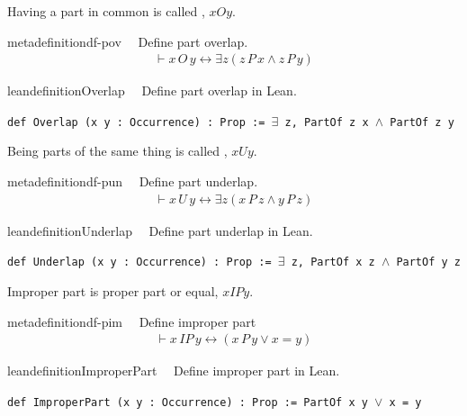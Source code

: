 \pn Having a part in common is called , $xOy$.
\begin{restatable}{metadefinition}{df-pov}~~ Define part overlap.
\begin{align}
\vdash x \,O \,y \leftrightarrow \exists z ( z \,P \,x \wedge z \,P \,y
    )\label{eq:df-pov}\tag{df-pov}
\end{align}
\end{restatable}

\begin{restatable}{leandefinition}{Overlap}~~ Define part overlap in Lean.

\texttt{\textcolor{leancolor}{def} \textcolor{leanyellow}{Overlap} (x y : Occurrence) : Prop := $\exists$ z, PartOf z x $\wedge$ PartOf z y}
\label{Overlap}
\end{restatable}

\pn Being parts of the same thing is called , $xUy$.
\begin{restatable}{metadefinition}{df-pun}~~ Define part underlap.
\begin{align}
\vdash x \,U \,y \leftrightarrow \exists z ( x \,P \,z \wedge y \,P \,z
    )\label{eq:df-pun}\tag{df-pun}
\end{align}
\end{restatable}

\begin{restatable}{leandefinition}{Underlap}~~ Define part underlap in Lean.

\texttt{\textcolor{leancolor}{def} \textcolor{leanyellow}{Underlap} (x y : Occurrence) : Prop := $\exists$ z, PartOf x z $\wedge$ PartOf y z}
\label{Underlap}
\end{restatable}

\pn Improper part is proper part or equal, $xIPy$.
\begin{restatable}{metadefinition}{df-pim}~~ Define improper part
\begin{align}
\vdash x \,IP \,y \leftrightarrow ( x \,P \,y \vee x = y
    )\label{eq:df-pim}\tag{df-pim}
\end{align}
\end{restatable}

\begin{restatable}{leandefinition}{ImproperPart}~~ Define improper part in Lean.

\texttt{\textcolor{leancolor}{def} \textcolor{leanyellow}{ImproperPart} (x y : Occurrence) : Prop := PartOf x y $\vee$ x = y}
\label{ImproperPart}
\end{restatable}

